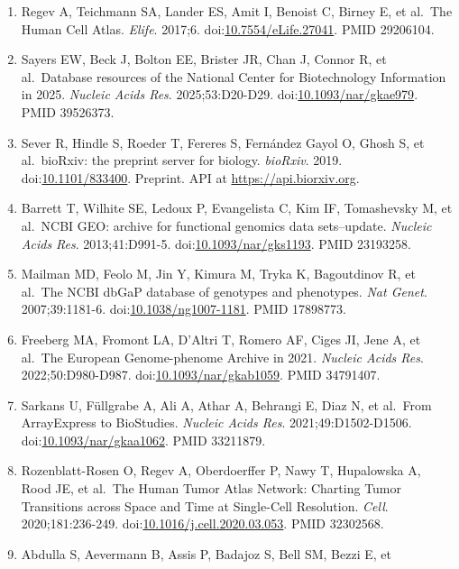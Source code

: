 \documentclass{article}
\begin{document}
\begin{enumerate}
  PMID 36163550.
\item
  Regev A, Teichmann SA, Lander ES, Amit I, Benoist C, Birney E, et
  al.~The Human Cell Atlas. \emph{Elife}. 2017;6.
  doi:\href{https://doi.org/10.7554/eLife.27041}{10.7554/eLife.27041}.
  PMID 29206104.
\item
  Sayers EW, Beck J, Bolton EE, Brister JR, Chan J, Connor R, et
  al.~Database resources of the National Center for Biotechnology
  Information in 2025. \emph{Nucleic Acids Res}. 2025;53:D20-D29.
  doi:\href{https://doi.org/10.1093/nar/gkae979}{10.1093/nar/gkae979}.
  PMID 39526373.
\item
  Sever R, Hindle S, Roeder T, Fereres S, Fernández Gayol O, Ghosh S, et
  al.~bioRxiv: the preprint server for biology. \emph{bioRxiv}. 2019.
  doi:\href{https://doi.org/10.1101/833400}{10.1101/833400}. Preprint.
  API at \url{https://api.biorxiv.org}.
\item
  Barrett T, Wilhite SE, Ledoux P, Evangelista C, Kim IF, Tomashevsky M,
  et al.~NCBI GEO: archive for functional genomics data sets--update.
  \emph{Nucleic Acids Res}. 2013;41:D991-5.
  doi:\href{https://doi.org/10.1093/nar/gks1193}{10.1093/nar/gks1193}.
  PMID 23193258.
\item
  Mailman MD, Feolo M, Jin Y, Kimura M, Tryka K, Bagoutdinov R, et
  al.~The NCBI dbGaP database of genotypes and phenotypes. \emph{Nat
  Genet}. 2007;39:1181-6.
  doi:\href{https://doi.org/10.1038/ng1007-1181}{10.1038/ng1007-1181}.
  PMID 17898773.
\item
  Freeberg MA, Fromont LA, D'Altri T, Romero AF, Ciges JI, Jene A, et
  al.~The European Genome-phenome Archive in 2021. \emph{Nucleic Acids
  Res}. 2022;50:D980-D987.
  doi:\href{https://doi.org/10.1093/nar/gkab1059}{10.1093/nar/gkab1059}.
  PMID 34791407.
\item
  Sarkans U, Füllgrabe A, Ali A, Athar A, Behrangi E, Diaz N, et
  al.~From ArrayExpress to BioStudies. \emph{Nucleic Acids Res}.
  2021;49:D1502-D1506.
  doi:\href{https://doi.org/10.1093/nar/gkaa1062}{10.1093/nar/gkaa1062}.
  PMID 33211879.
\item
  Rozenblatt-Rosen O, Regev A, Oberdoerffer P, Nawy T, Hupalowska A,
  Rood JE, et al.~The Human Tumor Atlas Network: Charting Tumor
  Transitions across Space and Time at Single-Cell Resolution.
  \emph{Cell}. 2020;181:236-249.
  doi:\href{https://doi.org/10.1016/j.cell.2020.03.053}{10.1016/j.cell.2020.03.053}.
  PMID 32302568.
\item
  Abdulla S, Aevermann B, Assis P, Badajoz S, Bell SM, Bezzi E, et

\end{enumerate}
\end{document}

